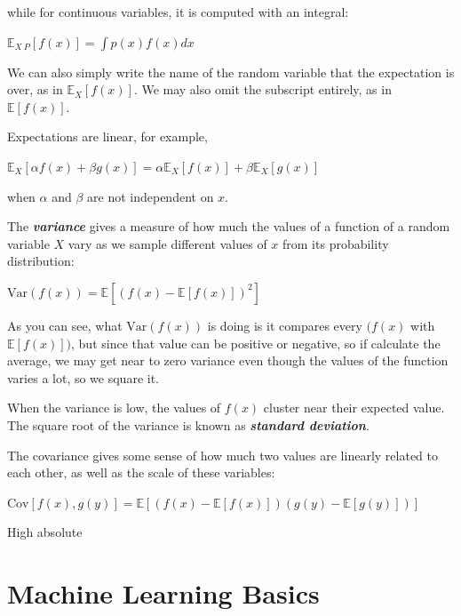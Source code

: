 \documentclass{report}
\begin{document}
\noindent while for continuous variables, it is computed with an integral:\newline\newline
\centerline{$\mathbb{E}_{X~P}[f(x)] = \int p(x)f(x)dx$}\newline

\noindent We can also simply write the name of the random variable that the expectation is over, as in $\mathbb{E}_X[f(x)]$. We may also omit the subscript entirely, as in $\mathbb{E}[f(x)]$.\newline

\noindent Expectations are linear, for example,\newline\newline
\centerline{$\mathbb{E}_X[\alpha f(x) + \beta g(x)] = \alpha \mathbb{E}_X[f(x)] + \beta \mathbb{E}_X[g(x)]$}\newline
when $\alpha$ and $\beta$ are not independent on $x$.\newline

\noindent The \textbf{\textit{variance}} gives a measure of how much the values of a function of a random variable $X$ vary as we sample different values of $x$ from its probability distribution:\newline\newline
\centerline{$\text{Var}(f(x)) = \mathbb{E}[(f(x) - \mathbb{E}[f(x)])^2]$}

\noindent As you can see, what $\text{Var}(f(x))$ is doing is it compares every $(f(x)$ with $\mathbb{E}[f(x)])$, but since that value can be positive or negative, so if calculate the average, we may get near to zero variance even though the values of the function varies a lot, so we square it.\newline

\noindent When the variance is low, the values of $f(x)$ cluster near their expected value. The square root of the variance is known as \textbf{\textit{standard deviation}}.\newline

\noindent The covariance gives some sense of how much two values are linearly related to each other, as well as the scale of these variables:\newline\newline
\centerline{$\text{Cov}[f(x),g(y)]=\mathbb{E}[(f(x)-\mathbb{E}[f(x)])(g(y)-\mathbb{E}[g(y)])]$}\newline

High absolute 


\chapter{Machine Learning Basics}
\end{document}
